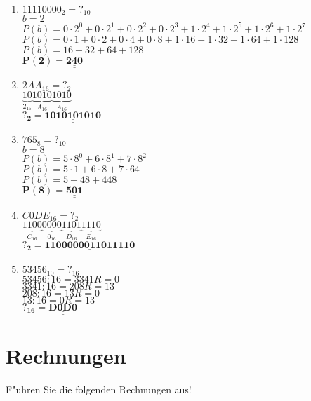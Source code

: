 \documentclass[a4paper,10pt]{article}
\def\doubleunderline#1{\underline{\underline{#1}}}
\begin{document}
\begin{enumerate}
\item $11110000_{2} = ?_{10}$ \\    %
	 {\color{ForestGreen}
		 $b=2$  \\
		 $P(b)= 0 \cdot 2^0 + 0 \cdot 2^1 + 0 \cdot 2^2 + 0 \cdot 2^3 + 1 \cdot 2^4+ 1 \cdot 2^5 + 1 \cdot 2^6 + 1 \cdot 2^7$ \\
		 $P(b)= 0 \cdot 1 + 0 \cdot 2 + 0 \cdot 4 + 0 \cdot 8 + 1 \cdot 16 + 1 \cdot 32 + 1 \cdot 64 + 1 \cdot 128$ \\
		 $P(b)= 16 + 32 + 64 + 128$ \\
		 $\mathbf{P(2)= \doubleunderline{240}}$
	 }
\item $2AA_{16} = ?_{2}$ \\               %
	 {\color{ForestGreen}
		 $\underbrace{10}_\text{$2_{16}$}\underbrace{1010}_\text{$A_{16}$}\underbrace{1010}_\text{$A_{16}$}$  \\
		 $\mathbf{?_{2} = \doubleunderline{1010101010}}$
	 }
\item $765_{8} = ?_{10}$ \\               %
	 {\color{ForestGreen}
		 $b=8$  \\
		 $P(b)= 5 \cdot 8^0 + 6 \cdot 8^1 + 7 \cdot 8^2$ \\
		 $P(b)= 5 \cdot 1 + 6 \cdot 8 + 7 \cdot 64$ \\
		 $P(b)= 5 + 48 + 448$ \\
		 $\mathbf{P(8)= \doubleunderline{501}}$
	 }
\item $C0DE_{16} = ?_{2}$ \\            %
	 {\color{ForestGreen}
		 $\underbrace{1100}_\text{$C_{16}$}\underbrace{0000}_\text{$0_{16}$}\underbrace{1101}_\text{$D_{16}$}
		 \underbrace{1110}_\text{$E_{16}$}$  \\
		 $\mathbf{?_{2} = \doubleunderline{1100000011011110}}$
	 }
\item $53456_{10} = ?_{16}$ \\         %
	 {\color{ForestGreen}
		 $53456 : 16 = 3341 R=0$  \\
		 $3341 : 16 = 208 R=13$ \\
		 $208 : 16 = 13 R=0$ \\
		 $13 : 16 = 0 R=13$ \\
		 $\mathbf{?_{16} = \doubleunderline{D0D0}}$
	 }
\end{enumerate}

\section{Rechnungen}
F"uhren Sie die folgenden Rechnungen aus!
\end{document}
